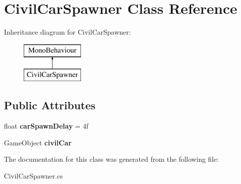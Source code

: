 \hypertarget{class_civil_car_spawner}{}\section{Civil\+Car\+Spawner Class Reference}
\label{class_civil_car_spawner}
Inheritance diagram for Civil\+Car\+Spawner\+:\begin{figure}[H]
\begin{center}
\leavevmode
\includegraphics[height=2.000000cm]{class_civil_car_spawner}
\end{center}
\end{figure}
\subsection*{Public Attributes}
\begin{DoxyCompactItemize}
\item 
\mbox{\label{class_civil_car_spawner_a073ee708a84ce77cdb3fe77b8d0437f8}} 
float {\bfseries car\+Spawn\+Delay} = 4f
\item 
\mbox{\label{class_civil_car_spawner_ab7010efa538bb073c7c66f77f7950b98}} 
Game\+Object {\bfseries civil\+Car}
\end{DoxyCompactItemize}


The documentation for this class was generated from the following file\+:\begin{DoxyCompactItemize}
\item 
Civil\+Car\+Spawner.\+cs\end{DoxyCompactItemize}
